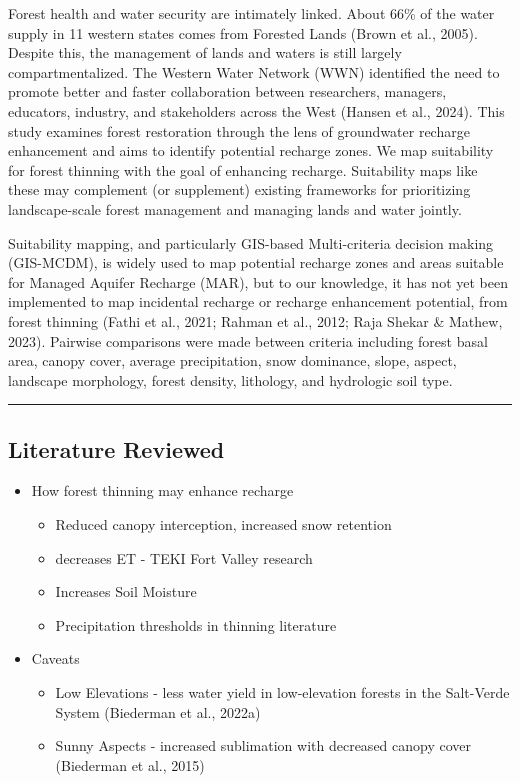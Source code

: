 \documentclass[
]{agujournal2019}
\begin{document}
Forest health and water security are intimately linked. About 66\% of
the water supply in 11 western states comes from Forested Lands (Brown
et al., 2005). Despite this, the management of lands and waters is still
largely compartmentalized. The Western Water Network (WWN) identified
the need to promote better and faster collaboration between researchers,
managers, educators, industry, and stakeholders across the West (Hansen
et al., 2024). This study examines forest restoration through the lens
of groundwater recharge enhancement and aims to identify potential
recharge zones. We map suitability for forest thinning with the goal of
enhancing recharge. Suitability maps like these may complement (or
supplement) existing frameworks for prioritizing landscape-scale forest
management and managing lands and water jointly.

Suitability mapping, and particularly GIS-based Multi-criteria decision
making (GIS-MCDM), is widely used to map potential recharge zones and
areas suitable for Managed Aquifer Recharge (MAR), but to our knowledge,
it has not yet been implemented to map incidental recharge or recharge
enhancement potential, from forest thinning (Fathi et al., 2021; Rahman
et al., 2012; Raja Shekar \& Mathew, 2023). Pairwise comparisons were
made between criteria including forest basal area, canopy cover, average
precipitation, snow dominance, slope, aspect, landscape morphology,
forest density, lithology, and hydrologic soil type.

\begin{center}\rule{0.5\linewidth}{0.5pt}\end{center}

\subsection{Literature Reviewed}\label{literature-reviewed}

\begin{itemize}
\item
  How forest thinning may enhance recharge

  \begin{itemize}
  \item
    Reduced canopy interception, increased snow retention
  \item
    decreases ET - TEKI Fort Valley research
  \item
    Increases Soil Moisture
  \item
    Precipitation thresholds in thinning literature
  \end{itemize}
\item
  Caveats

  \begin{itemize}
  \item
    Low Elevations - less water yield in low-elevation forests in the
    Salt-Verde System (Biederman et al., 2022a)
  \item
    Sunny Aspects - increased sublimation with decreased canopy cover
    (Biederman et al., 2015)
  \end{itemize}
\end{itemize}
\end{document}
